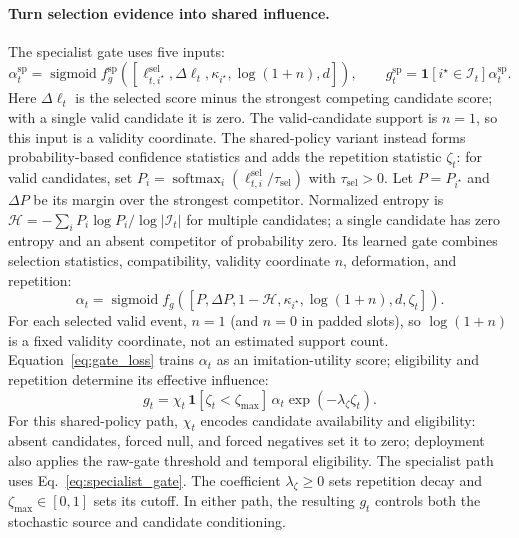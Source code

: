 \paragraph{Turn selection evidence into shared influence.}
The specialist gate uses five inputs:
\begin{equation}
 \alpha_t^{\mathrm{sp}}=\operatorname{sigmoid} f_g^{\mathrm{sp}}\!
 \left([\ell_{t,i^\star}^{\mathrm{sel}},\Delta\ell_t,
 \kappa_{i^\star},\log(1+n),d]\right),\qquad
 g_t^{\mathrm{sp}}=\mathbf1[i^\star\in\mathcal I_t]\alpha_t^{\mathrm{sp}}.
 \label{eq:specialist_gate}
\end{equation}
Here $\Delta\ell_t$ is the selected score minus the strongest competing candidate score; with a single valid candidate it is zero.
The valid-candidate support is $n=1$, so this input is a validity coordinate.
The shared-policy variant instead forms probability-based confidence statistics and adds the repetition statistic $\zeta_t$:
for valid candidates, set $P_i=\operatorname{softmax}_i(\ell_{t,i}^{\mathrm{sel}}/\tau_{\mathrm{sel}})$ with $\tau_{\mathrm{sel}}>0$.
Let $P=P_{i^\star}$ and $\Delta P$ be its margin over the strongest competitor.
Normalized entropy is $\mathcal H=-\sum_iP_i\log P_i/\log|\mathcal I_t|$ for multiple candidates; a single candidate has zero entropy and an absent competitor of probability zero.
Its learned gate combines selection statistics, compatibility, validity coordinate $n$, deformation, and repetition:
\begin{equation}
 \alpha_t=\operatorname{sigmoid} f_g\!\left(
 [P,\Delta P,1-\mathcal H,\kappa_{i^\star},\log(1+n),d,\zeta_t]\right).
 \label{eq:rawgate}
\end{equation}
For each selected valid event, $n=1$ (and $n=0$ in padded slots), so $\log(1+n)$ is a fixed validity coordinate, not an estimated support count.
Equation~\eqref{eq:gate_loss} trains $\alpha_t$ as an imitation-utility score; eligibility and repetition determine its effective influence:
\begin{equation}
 g_t=\chi_t\,\mathbf1[\zeta_t<\zeta_{\max}]\,
 \alpha_t\exp(-\lambda_\zeta\zeta_t).
 \label{eq:effectivegate}
\end{equation}
For this shared-policy path, $\chi_t$ encodes candidate availability and eligibility: absent candidates, forced null, and forced negatives set it to zero; deployment also applies the raw-gate threshold and temporal eligibility.
The specialist path uses Eq.~\eqref{eq:specialist_gate}.
The coefficient $\lambda_\zeta\geq0$ sets repetition decay and $\zeta_{\max}\in[0,1]$ sets its cutoff.
In either path, the resulting $g_t$ controls both the stochastic source and candidate conditioning.

